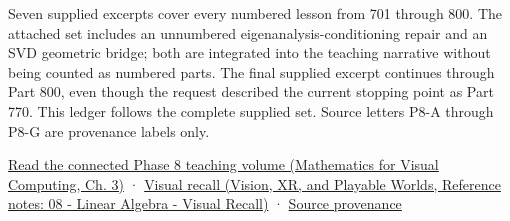 Seven supplied excerpts cover every numbered lesson from 701 through 800. The attached set includes an unnumbered eigenanalysis-conditioning repair and an SVD geometric bridge; both are integrated into the teaching narrative without being counted as numbered parts. The final supplied excerpt continues through Part 800, even though the request described the current stopping point as Part 770. This ledger follows the complete supplied set. Source letters P8-A through P8-G are provenance labels only.

\href{../02-Mathematics-for-Visual-Computing/main.pdf\#nameddest=01-foundations-i-ch019-the-graphics-problem-hiding-inside-a-matrix-equation}{Read the connected Phase 8 teaching volume (Mathematics for Visual Computing, Ch. 3)} · \href{../07-Vision-XR-and-Playable-Worlds/main.pdf\#nameddest=appendix-932cf7182ff1}{Visual recall (Vision, XR, and Playable Worlds, Reference notes: 08 - Linear Algebra - Visual Recall)} · \hyperref[appendix-a103e7846d21-phase-8---source-analysis-and-verification]{Source provenance}

